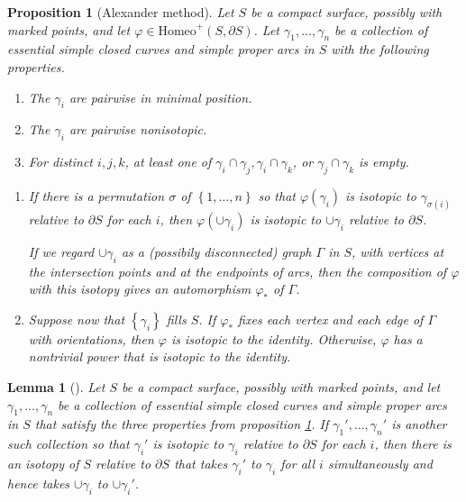 \documentclass[reqno]{amsart}
\newtheorem{lemma}[theorem]{Lemma}
\newtheorem{proposition}[theorem]{Proposition}
\theoremstyle{definition}
\theoremstyle{remark}
\newcommand{\Homeo}{{\mathrm{Homeo}}}
\begin{document}
\begin{proposition}[Alexander method]\label{Alexander-method}
    Let $S$ be a compact surface, possibly with marked points,
    and let $\varphi \in \Homeo^{+}\left( S, \partial S \right) $.
    Let $\gamma_1, \ldots, \gamma_n$ be a collection of essential
    simple closed curves and simple proper arcs in $S$ with
    the following properties.
    \begin{enumerate}
        \item The $\gamma_i$ are pairwise in minimal position.
        \item The $\gamma_i$ are pairwise nonisotopic.
        \item For distinct $i,j,k$, at least one of
            $\gamma_i \cap \gamma_j, \gamma_i\cap \gamma_k$,
            or $\gamma_j \cap \gamma_k$ is empty.
    \end{enumerate}
    \begin{enumerate}[label=(\roman*)]
        \item If there is a permutation $\sigma$ of $
            \left\{ 1, \ldots, n \right\} $ so that
            $\varphi \left( \gamma_i \right) $ is isotopic
            to $\gamma_{\sigma (i)}$ relative to
            $\partial S$ for each $i$, then
            $\varphi \left( \cup \gamma_i \right) $ is
            isotopic to $\cup \gamma_i$ relative to
            $\partial S$.

            If we regard $\cup \gamma_i$ as a (possibily disconnected)
            graph $\Gamma $ in $S$, with vertices at the
            intersection points and at the endpoints of arcs, then
            the composition of $\varphi $ with this isotopy
            gives an automorphism $\varphi_* $ of $\Gamma$.

        \item Suppose now that $\left\{ \gamma_i \right\} $ fills
            $S$. If $\varphi_*$ fixes each vertex and each
            edge of $\Gamma$ with orientations, then
            $\varphi $ is isotopic to the identity. Otherwise,
            $\varphi $ has a nontrivial power that is
            isotopic to the identity.
    \end{enumerate}
\end{proposition}

\begin{lemma}[]
    Let $S$ be a compact surface, possibly with marked points,
    and let $\gamma_1, \ldots, \gamma_n$ be a collection of
    essential simple closed curves and simple proper arcs
    in $S$ that satisfy the three properties from 
    proposition \ref{Alexander-method}. If
    $\gamma_1', \ldots, \gamma_n'$ is another such collection
    so that $\gamma_i'$ is isotopic to $\gamma_i$ relative
    to $\partial S$ for each $i$, then there is an
    isotopy of $S$ relative to $\partial S$ that takes
    $\gamma_i'$ to $\gamma_i$ for all $i$ simultaneously and
    hence takes $\cup \gamma_i$ to $\cup \gamma_i'$.
\end{lemma}
\end{document}
